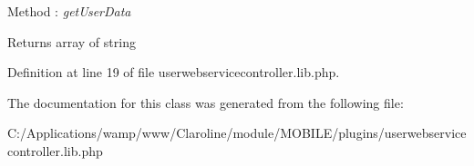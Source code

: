\begin{DoxyPre}        Method : {\itshape getUserData\/}\end{DoxyPre}


\begin{DoxyReturn}{Returns}
array of string 
\end{DoxyReturn}


Definition at line 19 of file userwebservicecontroller.lib.php.



The documentation for this class was generated from the following file:\begin{DoxyCompactItemize}
\item 
C:/Applications/wamp/www/Claroline/module/MOBILE/plugins/userwebservicecontroller.lib.php\end{DoxyCompactItemize}
